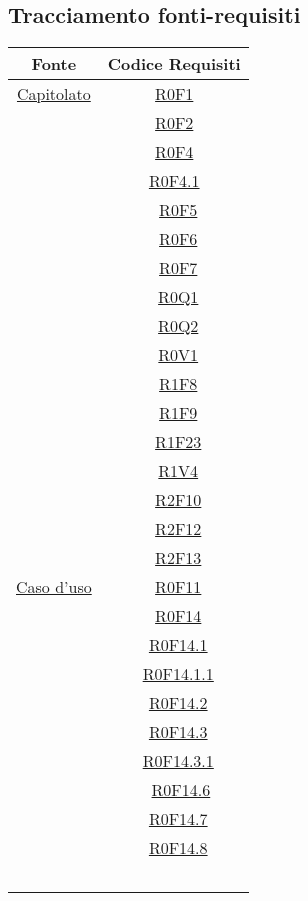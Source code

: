 \documentclass[../AnalisiDeiRequisiti.tex]{subfiles}
\begin{document}
\subsection{Tracciamento fonti-requisiti}
\normalsize
\begin{longtable}{|c|c|}
	\hline
	\textbf{Fonte} & \textbf{Codice Requisiti} \\
	\hline
	\endhead
	\hyperlink{Capitolato}{Capitolato} & \hyperlink{R0F1}{R0F1}\\& \hyperlink{R0F2}{R0F2}\\&
	\hyperlink{R0F4}{R0F4}\\&
	\hyperlink{R0F4.1}{R0F4.1}\\& \
	\hyperlink{R0F5}{R0F5}\\& \
	\hyperlink{R0F6}{R0F6}\\& \
	\hyperlink{R0F7}{R0F7}\\& \
	\hyperlink{R0Q1}{R0Q1}\\& \
	\hyperlink{R0Q2}{R0Q2}\\& \
	\hyperlink{R0V1}{R0V1}\\& \
	\hyperlink{R1F8}{R1F8}\\& \
	\hyperlink{R1F9}{R1F9}\\& \
	\hyperlink{R1F23}{R1F23}\\& \
	\hyperlink{R1V4}{R1V4}\\& \
	\hyperlink{R2F10}{R2F10}\\& \
	\hyperlink{R2F12}{R2F12}\\& \
	\hyperlink{R2F13}{R2F13}\\\hline
	\hyperlink{Caso d'uso}{Caso d'uso} & \
	\hyperlink{R0F11}{R0F11}\\& \
	\hyperlink{R0F14}{R0F14}\\& \
	\hyperlink{R0F14.1}{R0F14.1}\\& \
	\hyperlink{R0F14.1.1}{R0F14.1.1}\\& \
	\hyperlink{R0F14.2}{R0F14.2}\\& \
	\hyperlink{R0F14.3}{R0F14.3}\\& \
	\hyperlink{R0F14.3.1}{R0F14.3.1}\\& \
	\hyperlink{R0F14.6}{R0F14.6}\\& \
	\hyperlink{R0F14.7}{R0F14.7}\\& \
	\hyperlink{R0F14.8}{R0F14.8}\\& \

\end{longtable}
\end{document}
